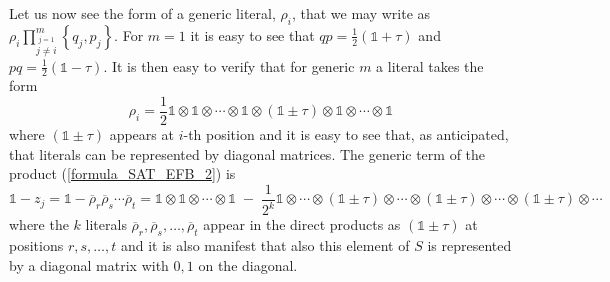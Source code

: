\documentclass[a4paper,twoside,11pt]{article}
\begin{document}
Let us now see the form of a generic literal, ${\ensuremath{\rho}}_i$, that we may write as ${\ensuremath{\rho}}_i \prod_{\stackrel{j = 1}{j \ne i}}^m {\ensuremath{\left\{ {q_j}, {p_j} \right\}}}$. For $m = 1$ it is easy to see that $qp = \frac{1}{2} ({\ensuremath{\mathbb{1}}} + \tau)$ and $pq = \frac{1}{2} ({\ensuremath{\mathbb{1}}} - \tau)$. It is then easy to verify that for generic $m$ a literal takes the form
\begin{equation}
\label{formula_generic_literal}
{\ensuremath{\rho}}_i = \frac{1}{2} {\ensuremath{\mathbb{1}}} \otimes {\ensuremath{\mathbb{1}}} \otimes \cdots \otimes {\ensuremath{\mathbb{1}}} \otimes ({\ensuremath{\mathbb{1}}} \pm \tau) \otimes {\ensuremath{\mathbb{1}}} \otimes \cdots \otimes {\ensuremath{\mathbb{1}}}
\end{equation}
where $({\ensuremath{\mathbb{1}}} \pm \tau)$ appears at $i$-th position and it is easy to see that, as anticipated, that literals can be represented by diagonal matrices. The generic term of the product (\ref{formula_SAT_EFB_2}) is
$$
{\ensuremath{\mathbb{1}}} - z_j = {\ensuremath{\mathbb{1}}} - {\overline{\ensuremath{\rho}}}_r {\overline{\ensuremath{\rho}}}_s \cdots {\overline{\ensuremath{\rho}}}_t = {\ensuremath{\mathbb{1}}} \otimes {\ensuremath{\mathbb{1}}} \otimes \cdots \otimes {\ensuremath{\mathbb{1}}} \; - \; \frac{1}{2^k} {\ensuremath{\mathbb{1}}} \otimes \cdots \otimes ({\ensuremath{\mathbb{1}}} \pm \tau) \otimes \cdots \otimes ({\ensuremath{\mathbb{1}}} \pm \tau) \otimes \cdots \otimes ({\ensuremath{\mathbb{1}}} \pm \tau) \otimes \cdots
$$
where the $k$ literals ${\overline{\ensuremath{\rho}}}_r, {\overline{\ensuremath{\rho}}}_s, \ldots, {\overline{\ensuremath{\rho}}}_t$ appear in the direct products as $({\ensuremath{\mathbb{1}}} \pm \tau)$ at positions $r, s, \ldots, t$ and it is also manifest that also this element of $S$ is represented by a diagonal matrix with $0, 1$ on the diagonal.
\end{document}
